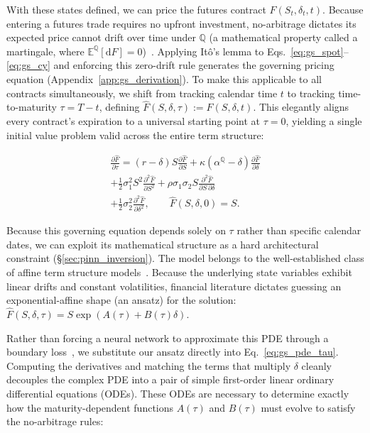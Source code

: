 \documentclass[sigconf, authorversion=true, nonacm=true]{acmart}
\newcommand{\convyield}{\delta}             %
\newcommand{\meanrev}{\kappa}               %
\newcommand{\longrun}{\alpha}               %
\begin{document}
With these states defined, we can price the futures contract $F(S_t, \convyield_t, t)$. Because entering a futures trade requires no upfront investment, no-arbitrage dictates its expected price cannot drift over time under $\mathbb{Q}$ (a mathematical property called a martingale, where $\mathbb{E}^{\mathbb{Q}}[\mathrm{d}F] = 0$)~\cite{harrison1981martingales}. Applying It\^{o}'s lemma to Eqs.~\ref{eq:gs_spot}--\ref{eq:gs_cy} and enforcing this zero-drift rule generates the governing pricing equation (Appendix~\ref{app:gs_derivation}). To make this applicable to all contracts simultaneously, we shift from tracking calendar time $t$ to tracking time-to-maturity $\tau = T - t$, defining $\hat{F}(S, \convyield, \tau) := F(S, \convyield, t)$. This elegantly aligns every contract's expiration to a universal starting point at $\tau = 0$, yielding a single initial value problem valid across the entire term structure:

\begin{equation}
  \label{eq:gs_pde_tau}
  \begin{multlined}
  \frac{\partial \hat{F}}{\partial \tau} = (r - \convyield)S\frac{\partial \hat{F}}{\partial S}
  + \meanrev(\longrun^{\mathbb{Q}} - \convyield)\frac{\partial \hat{F}}{\partial \convyield} \\
  + \frac{1}{2}\sigma_1^2 S^2 \frac{\partial^2 \hat{F}}{\partial S^2}
  + \rho\sigma_1\sigma_2 S \frac{\partial^2 \hat{F}}{\partial S\,\partial \convyield} \\
  + \frac{1}{2}\sigma_2^2 \frac{\partial^2 \hat{F}}{\partial \convyield^2},
  \qquad \hat{F}(S, \convyield, 0) = S.
  \end{multlined}
\end{equation}

Because this governing equation depends solely on $\tau$ rather than specific calendar dates, we can exploit its mathematical structure as a hard architectural constraint (\S\ref{sec:pinn_inversion}). The model belongs to the well-established class of affine term structure models~\cite{duffie2000transform}. Because the underlying state variables exhibit linear drifts and constant volatilities, financial literature dictates guessing an exponential-affine shape (an ansatz) for the solution: $\hat{F}(S, \convyield, \tau) = S \exp(A(\tau) + B(\tau)\convyield)$. 

Rather than forcing a neural network to approximate this PDE through a boundary loss~\cite{Hoshisashi2024Physics-InformedPDEs}, we substitute our ansatz directly into Eq.~\ref{eq:gs_pde_tau}. Computing the derivatives and matching the terms that multiply $\convyield$ cleanly decouples the complex PDE into a pair of simple first-order linear ordinary differential equations (ODEs). These ODEs are necessary to determine exactly how the maturity-dependent functions $A(\tau)$ and $B(\tau)$ must evolve to satisfy the no-arbitrage rules:
\end{document}
